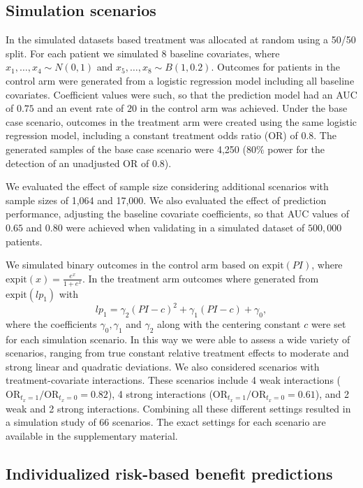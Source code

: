 \documentclass{article}
\begin{document}
\hypertarget{simulation-scenarios}{%
\subsection{Simulation scenarios}\label{simulation-scenarios}}

In the simulated datasets based treatment was allocated at random using
a 50/50 split. For each patient we simulated \(8\) baseline covariates,
where \(x_1,\dots,x_4\sim N(0, 1)\) and \(x_5,\dots,x_8\sim B(1, 0.2)\).
Outcomes for patients in the control arm were generated from a logistic
regression model including all baseline covariates. Coefficient values
were such, so that the prediction model had an AUC of \(0.75\) and an
event rate of \(20%
\) in the control arm was achieved. Under the base case scenario,
outcomes in the treatment arm were created using the same logistic
regression model, including a constant treatment odds ratio (OR) of
\(0.8\). The generated samples of the base case scenario were 4,250
(\(80\%\) power for the detection of an unadjusted OR of \(0.8\)).

We evaluated the effect of sample size considering additional scenarios
with sample sizes of 1,064 and 17,000. We also evaluated the effect of
prediction performance, adjusting the baseline covariate coefficients,
so that AUC values of \(0.65\) and \(0.80\) were achieved when
validating in a simulated dataset of \(500,000\) patients.

We simulated binary outcomes in the control arm based on
\(\text{expit}(PI)\), where \(\text{expit}(x)= \frac{e^x}{1 + e^x}\). In
the treatment arm outcomes where generated from \(\text{expit}(lp_1)\)
with \[ lp_1 = \gamma_2(PI-c)^2 + \gamma_1(PI-c) + \gamma_0,\] where the
coefficients \(\gamma_0, \gamma_1\) and \(\gamma_2\) along with the
centering constant \(c\) were set for each simulation scenario. In this
way we were able to assess a wide variety of scenarios, ranging from
true constant relative treatment effects to moderate and strong linear
and quadratic deviations. We also considered scenarios with
treatment-covariate interactions. These scenarios include 4 weak
interactions (\(\text{OR}_{t_x=1} / \text{OR}_{t_x=0}=0.82\)), 4 strong
interactions (\(\text{OR}_{t_x=1} / \text{OR}_{t_x=0}=0.61\)), and 2
weak and 2 strong interactions. Combining all these different settings
resulted in a simulation study of \(66\) scenarios. The exact settings
for each scenario are available in the supplementary material.

\hypertarget{individualized-risk-based-benefit-predictions}{%
\subsection{Individualized risk-based benefit
predictions}\label{individualized-risk-based-benefit-predictions}}
\end{document}
